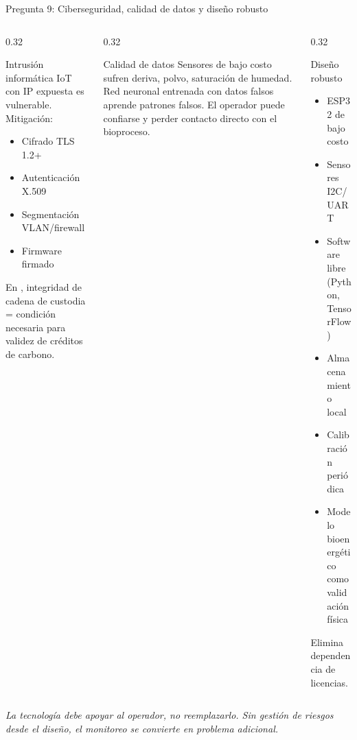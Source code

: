 \documentclass[aspectratio=169, 11pt]{beamer}
\newcommand{\NDIR}{\text{NDIR}}
\newcommand{\MRV}{\text{MRV}}
\begin{document}
\begin{frame}{Pregunta 9: Ciberseguridad, calidad de datos y diseño robusto}
\begin{columns}[T]
\begin{column}{0.32\textwidth}
\begin{alertblock}{Intrusión informática}
\footnotesize
IoT con IP expuesta es vulnerable. Mitigación:
\begin{itemize}
    \item Cifrado TLS 1.2+
    \item Autenticación X.509
    \item Segmentación VLAN/firewall
    \item Firmware firmado
\end{itemize}
En \MRV, integridad de cadena de custodia = condición necesaria para validez de créditos de carbono.
\end{alertblock}
\end{column}
\begin{column}{0.32\textwidth}
\begin{block}{Calidad de datos}
\footnotesize
Sensores de bajo costo sufren deriva, polvo, saturación de humedad. Red neuronal entrenada con datos falsos aprende patrones falsos. El operador puede confiarse y perder contacto directo con el bioproceso.
\end{block}
\end{column}
\begin{column}{0.32\textwidth}
\begin{exampleblock}{Diseño robusto}
\footnotesize
\begin{itemize}
    \item ESP32 de bajo costo
    \item Sensores \NDIR{} I2C/UART
    \item Software libre (Python, TensorFlow)
    \item Almacenamiento local
    \item Calibración periódica
    \item Modelo bioenergético como validación física
\end{itemize}
Elimina dependencia de licencias.
\end{exampleblock}
\end{column}
\end{columns}
\vspace{0.2cm}
\centering
\footnotesize\textit{La tecnología debe apoyar al operador, no reemplazarlo. Sin gestión de riesgos desde el diseño, el monitoreo se convierte en problema adicional.}
\end{frame}
\end{document}
